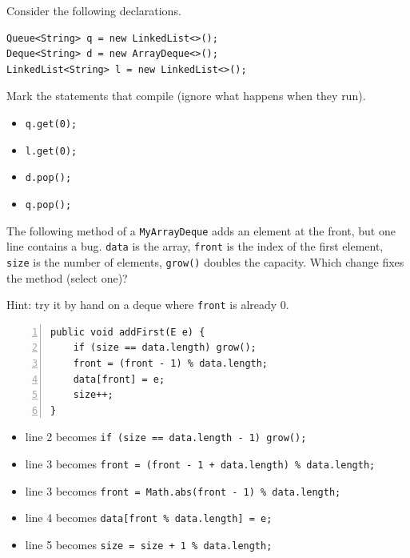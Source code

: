 \begin{question}
Consider the following declarations.

\begin{lstlisting}
Queue<String> q = new LinkedList<>();
Deque<String> d = new ArrayDeque<>();
LinkedList<String> l = new LinkedList<>();
\end{lstlisting}

Mark the statements that compile (ignore what happens when they run).
\begin{itemize}[leftmargin=2em,itemsep=1pt,topsep=2pt]
\item[\cb{0}] \lstinline|q.get(0);|
\item[\cb{1}] \lstinline|l.get(0);|
\item[\cb{1}] \lstinline|d.pop();|
\item[\cb{0}] \lstinline|q.pop();|
\end{itemize}
\end{question}

\begin{question}
The following method of a \lstinline|MyArrayDeque| adds an element at the front, but one line contains a bug.
\lstinline|data| is the array, \lstinline|front| is the index of the first element, \lstinline|size| is the number of elements, \lstinline|grow()| doubles the capacity.
Which change fixes the method (select one)?

Hint: try it by hand on a deque where \lstinline|front| is already 0.

\begin{lstlisting}[numbers=left,numberstyle=\tiny,xleftmargin=2em]
public void addFirst(E e) {
    if (size == data.length) grow();
    front = (front - 1) % data.length;
    data[front] = e;
    size++;
}
\end{lstlisting}

\begin{itemize}[leftmargin=2em,itemsep=1pt,topsep=2pt]
\item[\cb{0}] line 2 becomes \lstinline|if (size == data.length - 1) grow();|
\item[\cb{1}] line 3 becomes \lstinline[keepspaces=true]|front = (front - 1 + data.length) % data.length;|
\item[\cb{0}] line 3 becomes \lstinline|front = Math.abs(front - 1) % data.length;|
\item[\cb{0}] line 4 becomes \lstinline[keepspaces=true]|data[front % data.length] = e;|
\item[\cb{0}] line 5 becomes \lstinline[keepspaces=true]|size = size + 1 % data.length;|
\end{itemize}
\end{question}

